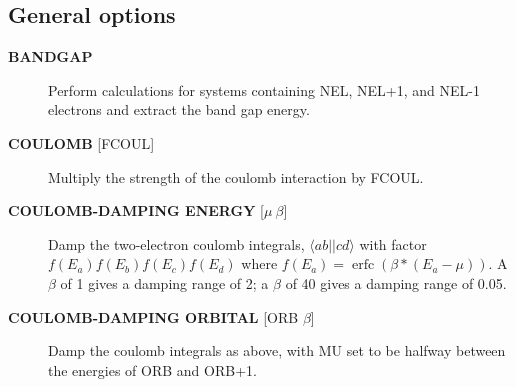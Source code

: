 \documentclass[openany,a4paper,10pt]{manual}
\newcommand{\bra}{\ensuremath{\langle}}
\newcommand{\ket}{\ensuremath{\rangle}}
\begin{document}
\subsection{General options}
\begin{description}
\item[\textbf{BANDGAP}]
Perform calculations for systems containing NEL, NEL+1, and NEL-1
electrons and extract the band gap energy.

\item[\textbf{COULOMB} {[}FCOUL{]}]
Multiply the strength of the coulomb interaction by FCOUL.

\item[\textbf{COULOMB-DAMPING ENERGY} {[}$\mu\ \beta${]}]
Damp the two-electron coulomb integrals, $\bra ab ||
c d\ket$ with factor $f(E_a)f(E_b)f(E_c)f(E_d)$ where
$f(E_a)=\operatorname{erfc}(\beta*(E_a-\mu))$.  A $\beta$
of 1 gives a damping range of 2; a $\beta$ of 40 gives a damping
range of 0.05.

\item[\textbf{COULOMB-DAMPING ORBITAL} {[}ORB $\beta${]}]
Damp the coulomb integrals as above, with MU set to be halfway between
the energies of ORB and ORB+1.

\end{description}
\end{document}
